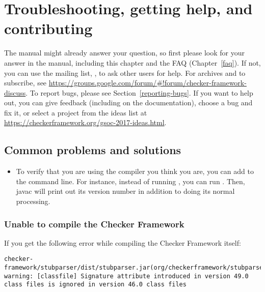 \htmlhr
\chapter{Troubleshooting, getting help, and contributing\label{troubleshooting}}

\begin{sloppypar}
The manual might already answer your question, so first please look for
your answer in the manual,
including this chapter and the FAQ (Chapter~\ref{faq}).
If not, you can use the mailing list,
, to ask other users for
help.  For archives and to subscribe, see \url{https://groups.google.com/forum/#!forum/checker-framework-discuss}.
To report bugs, please see Section~\ref{reporting-bugs}.
If you want to help out, you can give feedback (including on the
documentation), choose a bug and fix it, or select a
project from the ideas list at
\url{https://checkerframework.org/gsoc-2017-ideas.html}.
\end{sloppypar}


\section{Common problems and solutions\label{common-problems}}

\begin{itemize}
\item
To verify that you are using the compiler you think you are, you can add
 to the command line.  For instance, instead of running
, you can run .  Then, javac will print out its version number in addition
to doing its normal processing.

\end{itemize}


\subsection{Unable to compile the Checker Framework\label{common-problems-compiling}}

If you get the following error while compiling the Checker Framework itself:

\begin{smaller}
\begin{Verbatim}
checker-framework/stubparser/dist/stubparser.jar(org/checkerframework/stubparser/ast/CompilationUnit.class):
warning: [classfile] Signature attribute introduced in version 49.0 class files is ignored in version 46.0 class files
\end{Verbatim}
\end{smaller}

